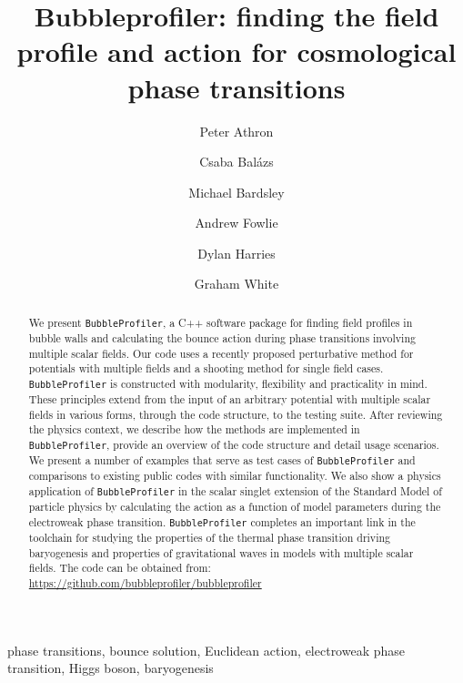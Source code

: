 \documentclass[final,3p,11pt,pdflatex]{elsarticle}
\makeatletter
\newcommand{\bpgitrepo}{%
  \url{https://github.com/bubbleprofiler/bubbleprofiler}\xspace}
\newcommand{\bphomepage}{\bpgitrepo}
\newcommand{\bp}{\texttt{BubbleProfiler}\@\xspace}
\makeatother
\begin{document}
\begin{frontmatter}
 \vspace*{0.5cm}
 \title{\Large\bf Bubbleprofiler: finding the field profile and action for cosmological  phase transitions}

\author[Monash]{Peter Athron}
\author[Monash]{Csaba Bal\'azs}
\author[Monash]{Michael Bardsley}
\author[Monash,Nanjing]{Andrew Fowlie}
\author[adelaide,prague]{Dylan Harries}
\author[Monash,Triumf]{Graham White}
\address[Monash]{ARC Centre of Excellence for Particle Physics at
  the Terascale, School of Physics, Monash University, Melbourne,
  Victoria 3800, Australia}
\address[Nanjing]{Department of Physics and Institute of Theoretical Physics, Nanjing Normal University, Nanjing, Jiangsu 210023, China}
\address[adelaide]{ARC Centre of Excellence for Particle Physics at
the Terascale, Department of Physics, The University of Adelaide,
Adelaide, South Australia 5005, Australia}
\address[prague]{Institute of Particle and Nuclear Physics, Faculty of
  Mathematics and Physics, Charles University in Prague, V
  Hole\v{s}ovi\v{c}k\'{a}ch 2, 180 00 Praha 8, Czech Republic}
\address[Triumf]{TRIUMF, 4004 Wesbrook Mall, Vancouver, British Columbia V6T 2A3, Canada}

  \begin{abstract}
    We present \bp, a C++ software package for finding field profiles in bubble walls and calculating the bounce action during phase transitions involving multiple scalar fields.
%
    Our code uses a recently proposed perturbative method for potentials with multiple fields and a shooting method for single field cases.
%
    \bp is constructed with modularity, flexibility and practicality in mind.
%
    These principles extend from the input of an arbitrary potential with multiple scalar fields in various forms, through the code structure, to the testing suite.
%
    \noindent After reviewing the physics context, we describe how the methods are implemented in \bp, provide an overview of the code structure and detail usage scenarios.
%
    We present a number of examples that serve as test cases of \bp and comparisons to existing public codes with similar functionality.
%
    We also show a physics application of \bp in the scalar singlet extension of the Standard Model of particle physics by calculating the action as a function of model parameters during the electroweak phase transition.
%
    \bp completes an important link in the toolchain for studying the properties of the thermal phase transition driving baryogenesis and properties of gravitational waves in models with multiple scalar fields.
%
    The code can be obtained from: \bphomepage
  \end{abstract}

\begin{keyword}
phase transitions,
bounce solution,
Euclidean action, 
electroweak phase transition,
Higgs boson,
baryogenesis
\end{keyword}
\end{frontmatter}
\end{document}
